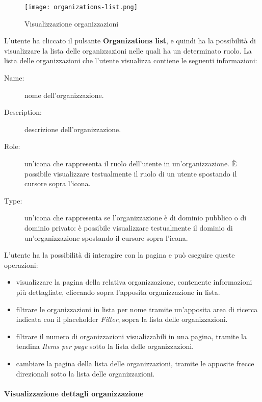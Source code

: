 \documentclass[../manuale-utente.tex]{subfiles}
\begin{document}
\begin{figure}[H]
    \centering
    \texttt{[image: organizations-list.png]}
    \caption{Visualizzazione organizzazioni}%
    \label{fig:web_app_visualizzazione_organizzazioni}
\end{figure}
L'utente ha cliccato il pulsante \textbf{Organizations list}, e quindi ha la possibilità di visualizzare la lista delle organizzazioni nelle quali ha un determinato ruolo.
La lista delle organizzazioni che l'utente visualizza contiene le seguenti informazioni:
\begin{description}
    \item[Name:] nome dell'organizzazione.
    \item[Description:] descrizione dell'organizzazione.
    \item[Role:] un'icona che rappresenta il ruolo dell'utente in un'organizzazione. È possibile visualizzare testualmente il ruolo di un utente spostando il cursore sopra l'icona.
    \item[Type:] un'icona che rappresenta se l'organizzazione è di dominio pubblico o di dominio privato: è possibile visualizzare testualmente il dominio di un'organizzazione spostando il cursore sopra l'icona.
\end{description}
L'utente ha la possibilità di interagire con la pagina e può eseguire queste operazioni:
\begin{itemize}
\item visualizzare la pagina della relativa organizzazione, contenente informazioni più dettagliate, cliccando sopra l'apposita organizzazione in lista.
\item filtrare le organizzazioni in lista per nome tramite un'apposita area di ricerca indicata con il placeholder \textit{Filter}, sopra la lista delle organizzazioni.
\item filtrare il numero di organizzazioni visualizzabili in una pagina, tramite la tendina \textit{Items per page} sotto la lista delle organizzazioni.
\item cambiare la pagina della lista delle organizzazioni, tramite le apposite frecce direzionali sotto la lista delle organizzazioni.
\end{itemize}

\paragraph{Visualizzazione dettagli organizzazione}%
\label{par:visualizzazione_dettagli_organizzazione}
\end{document}
